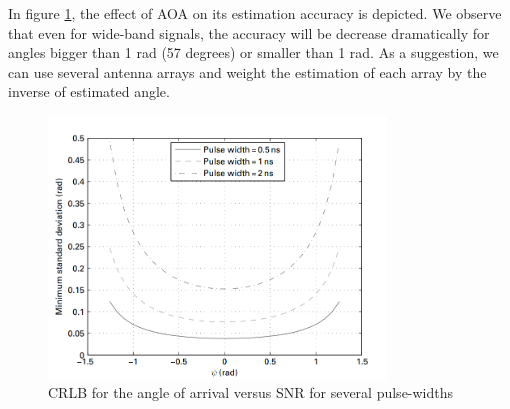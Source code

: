 \documentclass[\main/main.tex]{subfiles}
\begin{document}
In figure \ref{fig:aoa_crlb_versus_psi_for_various_pulse_widths}, the effect of AOA on its estimation accuracy is depicted. We observe that even for wide-band signals, the accuracy will be decrease dramatically for angles bigger than 1 rad (57 degrees) or smaller than 1 rad. As a suggestion, we can use several antenna arrays and weight the estimation of each array by the inverse of estimated angle.
\begin{figure}[!htbp]
    \centering
    \includegraphics[width=0.8\textwidth]{aoa_crlb_versus_psi_for_various_pulse_widths}
    \caption{CRLB for the angle of arrival versus SNR for several pulse-widths}
    \label{fig:aoa_crlb_versus_psi_for_various_pulse_widths}
\end{figure}
\end{document}
